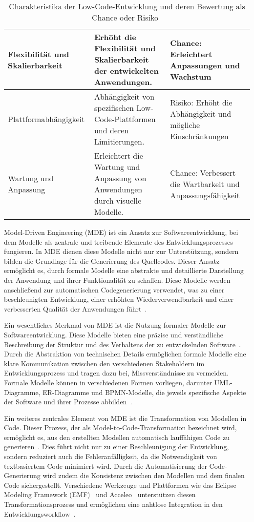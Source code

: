 \begin{table}[h!]
\begin{tabular}{|p{4cm}|p{6cm}|p{4cm}|}
    \hline
    Flexibilität und Skalierbarkeit & Erhöht die Flexibilität und Skalierbarkeit der entwickelten Anwendungen. & Chance: Erleichtert Anpassungen und Wachstum \\
    \hline
    Plattformabhängigkeit & Abhängigkeit von spezifischen Low-Code-Plattformen und deren Limitierungen. & Risiko: Erhöht die Abhängigkeit und mögliche Einschränkungen \\
    \hline
    Wartung und Anpassung & Erleichtert die Wartung und Anpassung von Anwendungen durch visuelle Modelle. & Chance: Verbessert die Wartbarkeit und Anpassungsfähigkeit \\
    \hline
    \end{tabular}
    \caption{Charakteristika der Low-Code-Entwicklung und deren Bewertung als Chance oder Risiko~\cite{Bock_2021, Shridhar_2021, Alamin_2021}}
    \label{tab:lowcode_characteristics}
\end{table}

Model-Driven Engineering (MDE) ist ein Ansatz zur Softwareentwicklung, bei dem Modelle als zentrale und treibende 
Elemente des Entwicklungsprozesses fungieren. In MDE dienen diese Modelle nicht nur zur Unterstützung, sondern 
bilden die Grundlage für die Generierung des Quellcodes. Dieser Ansatz ermöglicht es, durch formale Modelle 
eine abstrakte und detaillierte Darstellung der Anwendung und ihrer Funktionalität zu schaffen. Diese Modelle 
werden anschließend zur automatischen Codegenerierung verwendet, was zu einer beschleunigten Entwicklung, einer 
erhöhten Wiederverwendbarkeit und einer verbesserten Qualität der Anwendungen führt~\cite{Selic_2003}.

Ein wesentliches Merkmal von MDE ist die Nutzung formaler Modelle zur Softwareentwicklung. Diese Modelle bieten 
eine präzise und verständliche Beschreibung der Struktur und des Verhaltens der zu entwickelnden 
Software~\cite{Schmidt_2006}. Durch die Abstraktion von technischen Details ermöglichen formale Modelle 
eine klare Kommunikation zwischen den verschiedenen Stakeholdern im Entwicklungsprozess und tragen dazu bei, 
Missverständnisse zu vermeiden. Formale Modelle können in verschiedenen Formen vorliegen, darunter UML-Diagramme, 
ER-Diagramme und BPMN-Modelle, die jeweils spezifische Aspekte der Software und ihrer Prozesse abbilden~\cite{Selic_2003}.

Ein weiteres zentrales Element von MDE ist die Transformation von Modellen in Code. Dieser Prozess, der als 
Model-to-Code-Transformation bezeichnet wird, ermöglicht es, aus den erstellten Modellen automatisch lauffähigen 
Code zu generieren~\cite{brambilla2017model}. Dies führt nicht nur zu einer Beschleunigung der Entwicklung, sondern 
reduziert auch die Fehleranfälligkeit, da die Notwendigkeit von textbasiertem Code minimiert wird. Durch die Automatisierung der 
Code-Generierung wird zudem die Konsistenz zwischen den Modellen und dem finalen Code sichergestellt. Verschiedene 
Werkzeuge und Plattformen wie das Eclipse Modeling Framework (EMF)~\cite{eclipseEclipse} und 
Acceleo~\cite{eclipseEclipseAcceleo} unterstützen diesen Transformationsprozess 
und ermöglichen eine nahtlose Integration in den Entwicklungsworkflow~\cite{steinberg2008emf}.

